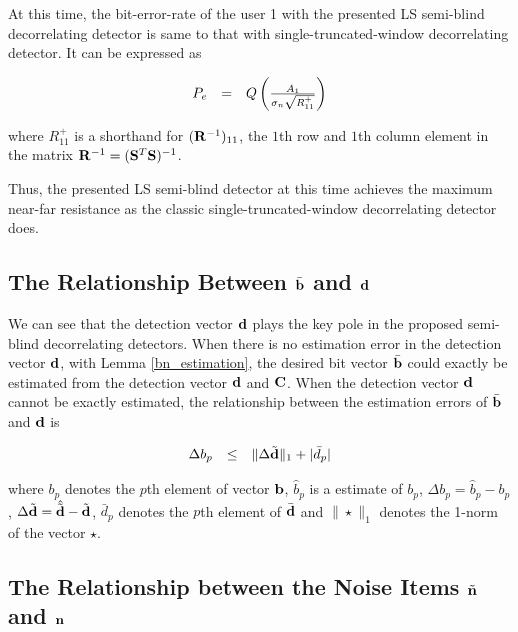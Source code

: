 \documentclass[a4paper,11pt,fleqn]{article}
\newcommand{\bb}{{\bf b}}
\newcommand{\bC}{{\bf C}}
\newcommand{\bd}{{\bf d}}
\newcommand{\bn}{{\bf n}}
\newcommand{\bS}{{\bf S}}
\newcommand{\bR}{{\bf R}}
\begin{document}
At this time, the bit-error-rate of the user 1 with the presented
LS semi-blind decorrelating detector is same to that with
single-truncated-window decorrelating detector. It can be
expressed as

\begin{equation}
\begin{array}{rcl}
P_{e}&=&Q\left({A_1\over \sigma_{n}\sqrt{R_{11}^+}}\right)
\end{array}
\end{equation}

\noindent where $R_{11}^+$ is a shorthand for $(\bR^{-1})_{11}$,
the $1$th row and $1$th column element in the matrix
$\bR^{-1}=(\bS^T\bS)^{-1}$.

Thus, the presented LS semi-blind detector at this time achieves
the maximum near-far resistance as the classic
single-truncated-window decorrelating detector does.

\subsection{The Relationship Between $\bar\bb$ and $\bd$}

We can see that the detection vector $\bd$ plays the key pole in
the proposed semi-blind decorrelating detectors. When there is no
estimation error in the detection vector $\bd$, with Lemma
\ref{bn_estimation}, the desired bit vector $\bar\bb$ could
exactly be estimated from the detection vector $\bd$ and $\bC$.
When the detection vector $\bd$ cannot be exactly estimated, the
relationship between the estimation errors of $\bar\bb$ and $\bd$
is

\begin{equation}
\begin{array}{rcl}
\Delta b_p&\leq&\|\Delta\tilde{\bd}\|_1+|\bar{d}_p|
\end{array}\label{b_error}
\end{equation}

\noindent where $b_p$ denotes the $p$th element of vector $\bb$,
$\hat{b}_p$ is a estimate of $b_p$, $\Delta b_p=\hat{b}_p-b_p$,
$\Delta\tilde{\bd}=\hat{\tilde{\bd}}-\tilde{\bd}$, $\bar{d}_p$
denotes the $p$th element of $\bar\bd$ and $\|\star\|_1$ denotes
the 1-norm of the vector $\star$.

\subsection{The Relationship between the Noise Items $\tilde{\bn}$ and $\bn$}
\end{document}
